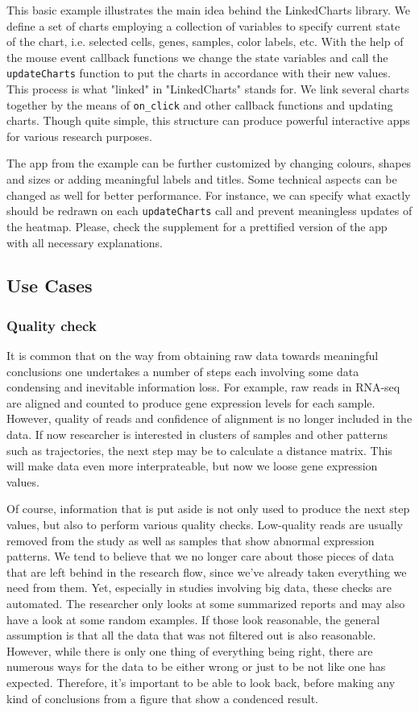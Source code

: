 \documentclass[twocolumn,10pt]{article}
\begin{document}
This basic example illustrates the main idea behind the LinkedCharts library. We define a set of charts employing a collection of variables to specify current state of the chart, i.e. selected cells, genes, samples, color labels, etc. With the help of the mouse event callback functions we change the state variables and call the \texttt{updateCharts} function to put the charts in accordance with their new values. This process is what "linked" in "LinkedCharts" stands for. We link several charts together by the means of \texttt{on_click} and other callback functions and updating charts. Though quite simple, this structure can produce powerful interactive apps for various research purposes.

The app from the example can be further customized by changing colours, shapes and sizes or adding meaningful labels and titles. Some technical aspects can be changed as well for better performance. For instance, we can specify what exactly should be redrawn on each \texttt{updateCharts} call and prevent meaningless updates of the heatmap. Please, check the supplement for a prettified version of the app with all necessary explanations.

\subsection{Use Cases}
\subsubsection{Quality check}

It is common that on the way from obtaining raw data towards meaningful conclusions one undertakes a number of steps each involving some data condensing and inevitable information loss. For example, raw reads in RNA-seq are aligned and counted to produce gene expression levels for each sample. However, quality of reads and confidence of alignment is no longer included in the data. If now researcher is interested in clusters of samples and other patterns such as trajectories, the next step may be to calculate a distance matrix. This will make data even more interprateable, but now we loose gene expression values. 

Of course, information that is put aside is not only used to produce the next step values, but also to perform various quality checks. Low-quality reads are usually removed from the study as well as samples that show abnormal expression patterns. We tend to believe that we no longer care about those pieces of data that are left behind in the research flow, since we've already taken everything we need from them. Yet, especially in studies involving big data, these checks are automated. The researcher only looks at some summarized reports and may also have a look at some random examples. If those look reasonable, the general assumption is that all the data that was not filtered out is also reasonable. However, while there is only one thing of everything being right, there are numerous ways for the data to be either wrong or just to be not like one has expected. Therefore, it's important to be able to look back, before making any kind of conclusions from a figure that show a condenced result.
\end{document}
